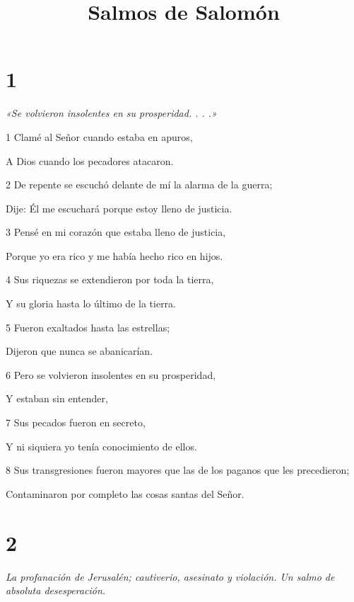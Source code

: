 

\title{Salmos de Salomón}

\chapter{1}

\par \textit{«Se volvieron insolentes en su prosperidad. . . .»}

\par 1 Clamé al Señor cuando estaba en apuros,
\par     A Dios cuando los pecadores atacaron.
\par 2 De repente se escuchó delante de mí la alarma de la guerra;
\par     Dije: Él me escuchará porque estoy lleno de justicia.
\par 3 Pensé en mi corazón que estaba lleno de justicia,
\par     Porque yo era rico y me había hecho rico en hijos.
\par 4 Sus riquezas se extendieron por toda la tierra,
\par     Y su gloria hasta lo último de la tierra.
\par 5 Fueron exaltados hasta las estrellas;
\par     Dijeron que nunca se abanicarían.
\par 6 Pero se volvieron insolentes en su prosperidad,
\par     Y estaban sin entender,
\par 7 Sus pecados fueron en secreto,
\par     Y ni siquiera yo tenía conocimiento de ellos.
\par 8 Sus transgresiones fueron mayores que las de los paganos que les precedieron;
\par     Contaminaron por completo las cosas santas del Señor.

\chapter{2}

\par \textit{La profanación de Jerusalén; cautiverio, asesinato y violación. Un salmo de absoluta desesperación.}

